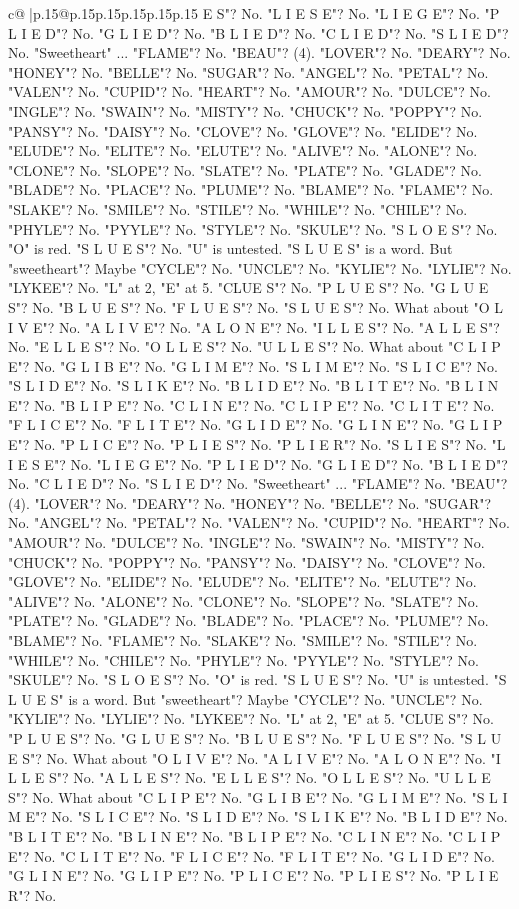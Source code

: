 \documentclass{article}
\begin{document}
{\begin{supertabular}{c@{$\;$}|p{.15\linewidth}@{}p{.15\linewidth}p{.15\linewidth}p{.15\linewidth}p{.15\linewidth}p{.15\linewidth}}
{{{E S"? No. "L I E S E"? No. "L I E G E"? No. "P L I E D"? No. "G L I E D"? No. "B L I E D"? No. "C L I E D"? No. "S L I E D"? No. "Sweetheart" ... "FLAME"? No. "BEAU"? (4). "LOVER"? No. "DEARY"? No. "HONEY"? No. "BELLE"? No. "SUGAR"? No. "ANGEL"? No. "PETAL"? No. "VALEN"? No. "CUPID"? No. "HEART"? No. "AMOUR"? No. "DULCE"? No. "INGLE"? No. "SWAIN"? No. "MISTY"? No. "CHUCK"? No. "POPPY"? No. "PANSY"? No. "DAISY"? No. "CLOVE"? No. "GLOVE"? No. "ELIDE"? No. "ELUDE"? No. "ELITE"? No. "ELUTE"? No. "ALIVE"? No. "ALONE"? No. "CLONE"? No. "SLOPE"? No. "SLATE"? No. "PLATE"? No. "GLADE"? No. "BLADE"? No. "PLACE"? No. "PLUME"? No. "BLAME"? No. "FLAME"? No. "SLAKE"? No. "SMILE"? No. "STILE"? No. "WHILE"? No. "CHILE"? No. "PHYLE"? No. "PYYLE"? No. "STYLE"? No. "SKULE"? No. "S L O E S"? No. "O" is red. "S L U E S"? No. "U" is untested. "S L U E S" is a word. But "sweetheart"? Maybe "CYCLE"? No. "UNCLE"? No. "KYLIE"? No. "LYLIE"? No. "LYKEE"? No. "L" at 2, "E" at 5. "CLUE S"? No. "P L U E S"? No. "G L U E S"? No. "B L U E S"? No. "F L U E S"? No. "S L U E S"? No. What about "O L I V E"? No. "A L I V E"? No. "A L O N E"? No. "I L L E S"? No. "A L L E S"? No. "E L L E S"? No. "O L L E S"? No. "U L L E S"? No. What about "C L I P E"? No. "G L I B E"? No. "G L I M E"? No. "S L I M E"? No. "S L I C E"? No. "S L I D E"? No. "S L I K E"? No. "B L I D E"? No. "B L I T E"? No. "B L I N E"? No. "B L I P E"? No. "C L I N E"? No. "C L I P E"? No. "C L I T E"? No. "F L I C E"? No. "F L I T E"? No. "G L I D E"? No. "G L I N E"? No. "G L I P E"? No. "P L I C E"? No. "P L I E S"? No. "P L I E R"? No. "S L I E S"? No. "L I E S E"? No. "L I E G E"? No. "P L I E D"? No. "G L I E D"? No. "B L I E D"? No. "C L I E D"? No. "S L I E D"? No. "Sweetheart" ... "FLAME"? No. "BEAU"? (4). "LOVER"? No. "DEARY"? No. "HONEY"? No. "BELLE"? No. "SUGAR"? No. "ANGEL"? No. "PETAL"? No. "VALEN"? No. "CUPID"? No. "HEART"? No. "AMOUR"? No. "DULCE"? No. "INGLE"? No. "SWAIN"? No. "MISTY"? No. "CHUCK"? No. "POPPY"? No. "PANSY"? No. "DAISY"? No. "CLOVE"? No. "GLOVE"? No. "ELIDE"? No. "ELUDE"? No. "ELITE"? No. "ELUTE"? No. "ALIVE"? No. "ALONE"? No. "CLONE"? No. "SLOPE"? No. "SLATE"? No. "PLATE"? No. "GLADE"? No. "BLADE"? No. "PLACE"? No. "PLUME"? No. "BLAME"? No. "FLAME"? No. "SLAKE"? No. "SMILE"? No. "STILE"? No. "WHILE"? No. "CHILE"? No. "PHYLE"? No. "PYYLE"? No. "STYLE"? No. "SKULE"? No. "S L O E S"? No. "O" is red. "S L U E S"? No. "U" is untested. "S L U E S" is a word. But "sweetheart"? Maybe "CYCLE"? No. "UNCLE"? No. "KYLIE"? No. "LYLIE"? No. "LYKEE"? No. "L" at 2, "E" at 5. "CLUE S"? No. "P L U E S"? No. "G L U E S"? No. "B L U E S"? No. "F L U E S"? No. "S L U E S"? No. What about "O L I V E"? No. "A L I V E"? No. "A L O N E"? No. "I L L E S"? No. "A L L E S"? No. "E L L E S"? No. "O L L E S"? No. "U L L E S"? No. What about "C L I P E"? No. "G L I B E"? No. "G L I M E"? No. "S L I M E"? No. "S L I C E"? No. "S L I D E"? No. "S L I K E"? No. "B L I D E"? No. "B L I T E"? No. "B L I N E"? No. "B L I P E"? No. "C L I N E"? No. "C L I P E"? No. "C L I T E"? No. "F L I C E"? No. "F L I T E"? No. "G L I D E"? No. "G L I N E"? No. "G L I P E"? No. "P L I C E"? No. "P L I E S"? No. "P L I E R"? No. }}}
\end{supertabular}}
\end{document}
